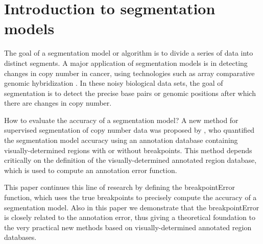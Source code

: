 \documentclass{article}
\begin{document}
  

  
 
\newpage

\section{Introduction to segmentation models}

The goal of a segmentation model or algorithm is to divide a series of
data into distinct segments. A major application of segmentation
models is in detecting changes in copy number in cancer, using
technologies such as array comparative genomic hybridization
\citep{PSS98}. In these noisy biological data sets, the goal of
segmentation is to detect the precise base pairs or genomic positions after
which there are changes in copy number.

How to evaluate the accuracy of a segmentation model? A new method for
supervised segmentation of copy number data was proposed by
\citet{HOCKING-breakpoints}, who quantified the segmentation model
accuracy using an annotation database containing visually-determined
regions with or without breakpoints.
This method depends critically on the
definition of the visually-determined annotated region database, which
is used to compute an annotation error function. 

This paper continues
this line of research by defining the breakpointError function, which
uses the true breakpoints to precisely compute the accuracy of a
segmentation model. Also in this paper we demonstrate that the
breakpointError is closely related to the annotation error, thus
giving a theoretical foundation to the very practical new methods
based on visually-determined annotated region databases.
\end{document}
